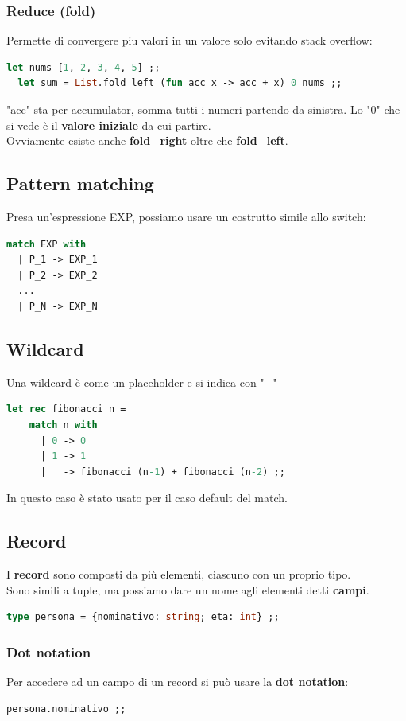 \documentclass[12pt,a4paper]{article}
\begin{document}
\subsubsection{Reduce (fold)}
Permette di convergere piu valori in un valore solo evitando stack overflow:
\begin{lstlisting}[language=OCaml]
  let nums [1, 2, 3, 4, 5] ;;
  let sum = List.fold_left (fun acc x -> acc + x) 0 nums ;;
\end{lstlisting}
"acc" sta per accumulator, somma tutti i numeri partendo da sinistra. Lo "$0$" che si vede è il \textbf{valore iniziale} da cui partire.\\
Ovviamente esiste anche \textbf{fold\_right} oltre che \textbf{fold\_left}.

\subsection{Pattern matching}
Presa un'espressione EXP, possiamo usare un costrutto simile allo switch:
\begin{lstlisting}[language=OCaml]
  match EXP with
  | P_1 -> EXP_1
  | P_2 -> EXP_2
  ...
  | P_N -> EXP_N
\end{lstlisting}
\subsection{Wildcard}
Una wildcard è come un placeholder e si indica con "\_"
\begin{lstlisting}[language=OCaml]
  let rec fibonacci n = 
    match n with
      | 0 -> 0
      | 1 -> 1
      | _ -> fibonacci (n-1) + fibonacci (n-2) ;;
\end{lstlisting}
In questo caso è stato usato per il caso default del match.

\subsection{Record}
I \textbf{record} sono composti da più elementi, ciascuno con un proprio tipo.\\
Sono simili a tuple, ma possiamo dare un nome agli elementi detti \textbf{campi}.\\
\begin{lstlisting}[language=OCaml]
  type persona = {nominativo: string; eta: int} ;;
\end{lstlisting}
\subsubsection{Dot notation}
Per accedere ad un campo di un record si può usare la \textbf{dot notation}:
\begin{lstlisting}[language=OCaml]
  persona.nominativo ;;
\end{lstlisting}
\end{document}
